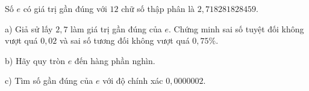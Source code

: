 \begin{ex}
Số $e$ có giá trị gần đúng với $12$ chữ số thập phân là $2{,}718281828459$.

a) Giả sử lấy $2{,}7$ làm giá trị gần đúng của $e$. Chứng minh sai số tuyệt đối không vượt quá $0{,}02$ và sai số tương đối không vượt quá $0{,}75\%$.

b) Hãy quy tròn $e$ đến hàng phần nghìn.

c) Tìm số gần đúng của $e$ với độ chính xác $0{,}0000002$.
\end{ex}
